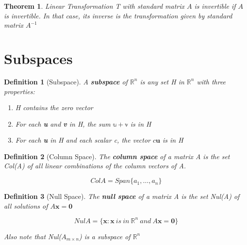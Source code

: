 \documentclass[12pt]{report}
\newtheorem{thm}{Theorem}
\newtheorem{dfn}{Definition}
\newcommand{\mtx}[3]{$#1_{#2\times #3}$}
\begin{document}
\begin{thm}
Linear Transformation T with standard matrix $A$ is invertible if $A$ is invertible. In that case, its inverse is the transformation given by standard matrix $A^{-1}$
\end{thm}

\section{Subspaces}

\begin{dfn}[Subspace]
A \textbf{subspace} of $\mathbb{R}^n$ is any set H in $\mathbb{R}^n$ with three properties:

\begin{enumerate}
\item H contains the zero vector
\item For each \textbf{u} and \textbf{v} in H, the sum $\mathbb{u}+\mathbb{v}$ is in H
\item For each \textbf{u} in H and each scalar c, the vector $c\bm{u}$ is in H
\end{enumerate}
\end{dfn}

\begin{dfn}[Column Space]
The \textbf{column space} of a matrix A is the set Col(A) of all linear combinations of the column vectors of A.

\begin{equation}
Col A = Span\{a_1,\ldots,a_n\}
\end{equation}

\end{dfn}

\begin{dfn}[Null Space]
The \textbf{null space} of a matrix A is the set Nul(A) of all solutions of $A\bm{x}=\bm{0}$

\begin{equation}
Nul A = \{\bm{x}:\bm{x} \: is \: in \: \mathbb{R}^n \: and \: A\bm{x}=\bm{0}\}
\end{equation}

Also note that Nul(\mtx{A}{m}{n}) is a subspace of $\mathbb{R}^n$

\end{dfn}
\end{document}
